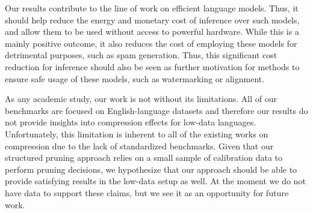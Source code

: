 \documentclass{article}
\theoremstyle{plain}
\theoremstyle{definition}
\theoremstyle{remark}
\begin{document}
Our results contribute to the line of work on efficient language models. Thus, it should help reduce the energy and monetary cost of inference over such models, and allow them to be used without access to powerful hardware. While this is a mainly positive outcome, it also reduces the cost of employing these models for detrimental purposes, such as spam generation. Thus, this significant cost reduction for inference should also be seen as further motivation for methods to ensure safe usage of these models, such as watermarking or alignment.

As any academic study, our work is not without its limitations. All of our benchmarks are focused on English-language datasets and therefore our results do not provide insights into compression effects for low-data languages. Unfortunately, this limitation is inherent to all of the existing works on compression due to the lack of standardized benchmarks. Given that our structured pruning approach relies on a small sample of calibration data to perform pruning decisions, we hypothesize that our approach should be able to provide satisfying results in the low-data setup as well. At the moment we do not have data to support these claims, but we see it as an opportunity for future work.

\end{document}

